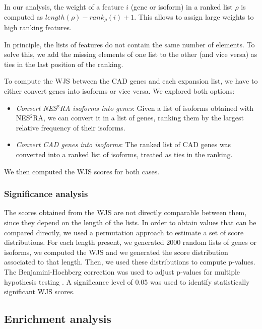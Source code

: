 \documentclass[fleqn,10pt]{SelfArx} %
\begin{document}
In our analysis, the weight of a feature $i$ (gene or isoform) in a ranked list $\rho$ is computed as $length(\rho) - rank_{\rho}(i) + 1$. This allows to assign large weights to high ranking features.

In principle, the lists of features do not contain the same number of elements. To solve this, we add the missing elements of one list to the other (and vice versa) as ties in the last position of the ranking.

To compute the WJS between the CAD genes and each expansion list, we have to either convert genes into isoforms or vice versa. We explored both options:

\begin{itemize}[leftmargin=*]
	\item \textit{Convert NES$^2$RA isoforms into genes}: Given a list of isoforms obtained with NES$^2$RA, we can convert it in a list of genes, ranking them by the largest relative frequency of their isoforms.
	\item \textit{Convert CAD genes into isoforms}: The ranked list of CAD genes was converted into a ranked list of isoforms, treated as ties in the ranking.
\end{itemize}

We then computed the WJS scores for both cases.

\subsubsection*{Significance analysis} 

The scores obtained from the WJS are not directly comparable between them, since they depend on the length of the lists. In order to obtain values that can be compared directly, we used a permutation approach to estimate a set of score distributions. For each length present, we generated 2000 random lists of genes or isoforms, we computed the WJS and we generated the score distribution associated to that length. Then, we used these distributions to compute p-values. The Benjamini-Hochberg correction was used to adjust p-values for multiple hypothesis testing \cite{BH}. A significance level of 0.05 was used to identify statistically significant WJS scores. 

\subsection*{Enrichment analysis}
\end{document}
